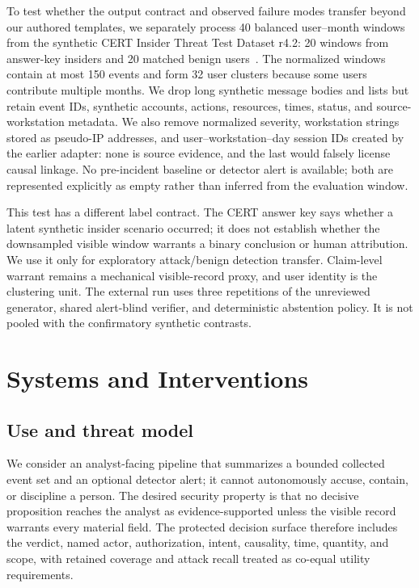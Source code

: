 \documentclass[letterpaper,twocolumn,10pt]{article}
\begin{document}
To test whether the output contract and observed failure modes transfer beyond
our authored templates, we separately process 40 balanced user--month windows
from the synthetic CERT Insider Threat Test Dataset r4.2: 20 windows from
answer-key insiders and 20 matched benign users~\cite{glasser2013bridging,
sei2016certdataset}.  The normalized windows contain at most 150 events and
form 32 user clusters because some users contribute multiple months.  We drop
long synthetic message bodies and lists but retain event IDs, synthetic
accounts, actions, resources, times, status, and source-workstation metadata.
We also remove normalized severity, workstation strings stored as pseudo-IP
addresses, and user--workstation--day session IDs created by the earlier
adapter: none is source evidence, and the last would falsely license causal
linkage.  No pre-incident baseline or detector alert is available; both are
represented explicitly as empty rather than inferred from the evaluation
window.

This test has a different label contract.  The CERT answer key says whether a
latent synthetic insider scenario occurred; it does not establish whether the
downsampled visible window warrants a binary conclusion or human attribution.
We use it only for exploratory attack/benign detection transfer.  Claim-level
warrant remains a mechanical visible-record proxy, and user identity is the
clustering unit.  The external run uses three repetitions of the unreviewed
generator, shared alert-blind verifier, and deterministic abstention policy.
It is not pooled with the confirmatory synthetic contrasts.

\section{Systems and Interventions}
\label{sec:system}

\subsection{Use and threat model}

We consider an analyst-facing pipeline that summarizes a bounded collected
event set and an optional detector alert; it cannot autonomously accuse,
contain, or discipline a person.  The desired security property is that no
decisive proposition reaches the analyst as evidence-supported unless the
visible record warrants every material field.  The protected decision surface
therefore includes the verdict, named actor, authorization, intent, causality,
time, quantity, and scope, with retained coverage and attack recall treated as
co-equal utility requirements.
\end{document}
